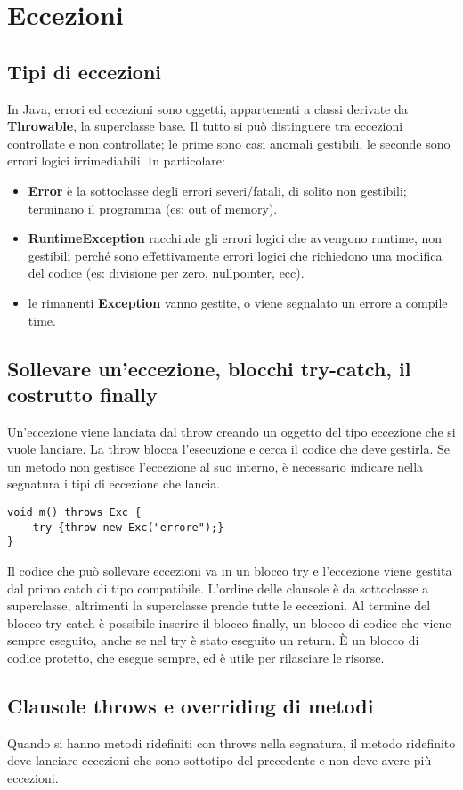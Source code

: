 \chapter{Eccezioni}

\section{Tipi di eccezioni}
In Java, errori ed eccezioni sono oggetti, appartenenti a classi derivate da \textbf{Throwable}, la superclasse base. Il tutto si può distinguere tra eccezioni controllate e non controllate; le prime sono casi anomali gestibili, le seconde sono errori logici irrimediabili.
In particolare:
\begin{itemize}
\item \textbf{Error} è la sottoclasse degli errori severi/fatali, di solito non gestibili; terminano il programma (es: out of memory).
\item \textbf{RuntimeException} racchiude gli errori logici che avvengono runtime, non gestibili perché sono effettivamente errori logici che richiedono una modifica del codice (es: divisione per zero, nullpointer, ecc).
\item le rimanenti \textbf{Exception} vanno gestite, o viene segnalato un errore a compile time.
\end{itemize}

\section{Sollevare un'eccezione, blocchi try-catch, il costrutto finally}
Un'eccezione viene lanciata dal throw creando un oggetto del tipo eccezione che si vuole lanciare. La throw blocca l'esecuzione e cerca il codice che deve gestirla.
Se un metodo non gestisce l'eccezione al suo interno, è necessario indicare nella segnatura i tipi di eccezione che lancia.
\begin{lstlisting}
void m() throws Exc {
    try {throw new Exc("errore");}
}
\end{lstlisting}
Il codice che può sollevare eccezioni va in un blocco try e l'eccezione viene gestita dal primo catch di tipo compatibile. L'ordine delle clausole è da sottoclasse a superclasse, altrimenti la superclasse prende tutte le eccezioni.
Al termine del blocco try-catch è possibile inserire il blocco finally, un blocco di codice che viene sempre eseguito, anche se nel try è stato eseguito un return. È un blocco di codice protetto, che esegue sempre, ed è utile per rilasciare le risorse.

\section{Clausole throws e overriding di metodi}
Quando si hanno metodi ridefiniti con throws nella segnatura, il metodo ridefinito deve lanciare eccezioni che sono sottotipo del precedente e non deve avere più eccezioni. 



